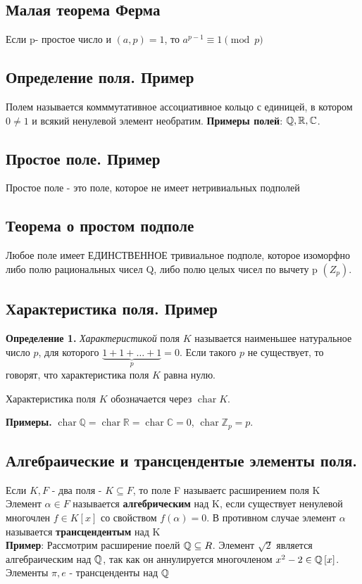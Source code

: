 \subsection{Малая теорема Ферма} 
Если p- простое число и $(a,p)=1$, то $a^{p-1} \equiv 1\pmod{p}$
\subsection{Определение поля. Пример}
Полем называется комммутативное ассоциативное кольцо с единицей, в котором $0\ne 1$ и всякий ненулевой элемент необратим.
\textbf{Примеры полей}: $\mathbb{Q}, \mathbb{R},\mathbb{C}$.
\subsection{Простое поле. Пример}
Простое поле - это поле, которое не имеет нетривиальных подполей
\subsection{Теорема о простом подполе}
Любое поле имеет ЕДИНСТВЕННОЕ тривиальное подполе, которое изоморфно либо полю рациональных чисел Q, либо полю целых чисел по вычету p  $(Z_{p})$.
\subsection{Характеристика поля. Пример}
\textbf{Определение 1.} \textit{Характеристикой} поля $K$ называется наименьшее натуральное число $p$, для которого $\underbrace{1 + 1 + \ldots + 1}_{p} = 0$. Если такого $p$ не существует, то говорят, что характеристика поля $K$ равна нулю.

Характеристика поля $K$ обозначается через $\operatorname{char} K$.

\textbf{Примеры.} $\operatorname{char} \mathbb{Q} = \operatorname{char} \mathbb{R} = \operatorname{char} \mathbb{C} = 0$, $\operatorname{char} \mathbb{Z}_p = p$.
\subsection{Алгебраические и трансцендентые элементы поля.}
Если $K, F$ - два поля - $K\subseteq F$, то поле F называетс расширением поля K\\
Элемент $\alpha\in F$ называется \textbf{алгебрическим} над K, если существует ненулевой многочлен $f\in K \left[x\right] $ со свойством $f(\alpha)= 0$. В противном случае элемент $\alpha$ называется \textbf{трансцендентым} над K\\
\textbf{Пример}: Рассмотрим расширение поелй $\mathbb{Q}\subseteq R$. Элемент $\sqrt2$ является алгебраическим над $\mathbb{Q}$, так как он аннулируется многочленом $x^2-2\in\mathbb{Q} \left[x\right]$. Элементы $\pi, e$ - трансценденты над $\mathbb{Q}$
